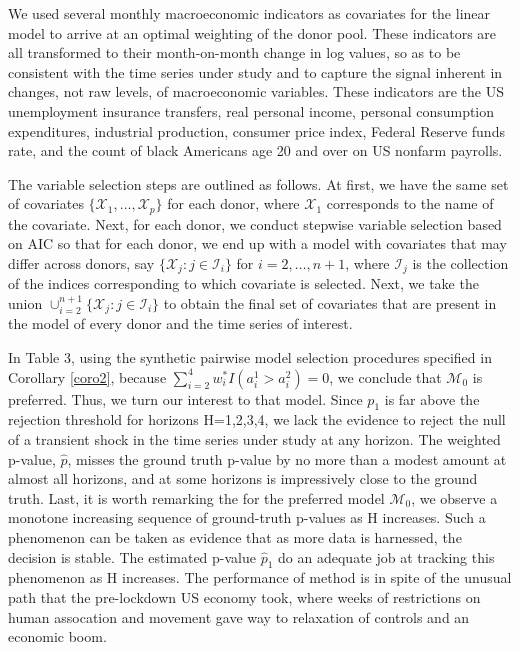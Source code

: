 \documentclass[11pt]{article}
\def\mc#1{\mathcal{#1}} %
\def\mc#1{\mathcal{#1}}
\theoremstyle{definition}
\begin{document}
We used several monthly macroeconomic indicators as covariates for the linear model to arrive at an optimal weighting of the donor pool.  These indicators are all transformed to their month-on-month change in log values, so as to be consistent with the time series under study and to capture the signal inherent in changes, not raw levels, of macroeconomic variables.  These indicators are the US unemployment insurance transfers, real personal income, personal consumption expenditures, industrial production, consumer price index, Federal Reserve funds rate, and the count of black Americans age 20 and over on US nonfarm payrolls.

The variable selection steps are outlined as follows. At first, we have the same set of covariates $\{\mc{X}_1, \ldots, \mc{X}_p\}$ for each donor, where $\mc{X}_1$ corresponds to the name of the covariate. Next, for each donor, we conduct stepwise variable selection based on AIC so that for each donor, we end up with a model with covariates that may differ across  donors, say $\{\mc{X}_j \colon j\in \mc{I}_i\}$ for $i = 2, \ldots, n+1$, where $\mc{I}_j$ is the collection of the indices corresponding to which covariate is selected. Next, we  take the union $\cup_{i=2}^{n+1}\{\mc{X}_j \colon j\in \mc{I}_i\}$ to obtain the final set of covariates that are present in the model of every donor and the time series of interest.

In Table 3, using the synthetic pairwise model selection procedures specified in Corollary \ref{coro2}, because $\sum_{i=2}^4 w_i^* I(a_i^1 > a_i^2) = 0$,  we conclude that  $\mc{M}_{0}$ is preferred. Thus, we turn our interest to that model.  Since $p_{1}$ is far above the rejection threshold for horizons H=1,2,3,4, we lack the evidence to reject the null of a transient shock in the time series under study at any horizon.  The weighted p-value, $\hat p $, misses the ground truth p-value by no more than a modest amount at almost all horizons, and at some horizons is impressively close to the ground truth.  Last, it is worth remarking the for the preferred model $\mc{M}_{0}$, we observe a monotone increasing sequence of ground-truth p-values as H increases.  Such a phenomenon can be taken as evidence that as more data is harnessed, the decision is stable.  The estimated p-value $\hat p_{1}$ do an adequate job at tracking this phenomenon as H increases.  The performance of method is in spite of the unusual path that the pre-lockdown US economy took, where weeks of restrictions on human assocation and movement gave way to relaxation of controls and an economic boom.  
\end{document}
